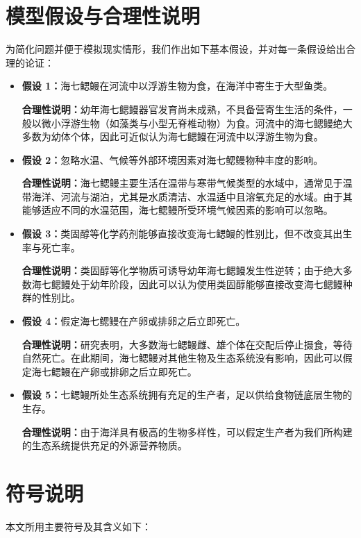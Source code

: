 \documentclass[11pt,a4paper]{ctexart}
\begin{document}
\section{模型假设与合理性说明}

为简化问题并便于模拟现实情形，我们作出如下基本假设，并对每一条假设给出合理的论证：

\begin{itemize}
\item \textbf{假设 1：}海七鳃鳗在河流中以浮游生物为食，在海洋中寄生于大型鱼类。

\textbf{合理性说明：}幼年海七鳃鳗器官发育尚未成熟，不具备营寄生生活的条件，一般以微小浮游生物（如藻类与小型无脊椎动物）为食\cite{3}。河流中的海七鳃鳗绝大多数为幼体个体，因此可近似认为海七鳃鳗在河流中以浮游生物为食。

\item \textbf{假设 2：}忽略水温、气候等外部环境因素对海七鳃鳗物种丰度的影响。

\textbf{合理性说明：}海七鳃鳗主要生活在温带与寒带气候类型的水域中，通常见于温带海洋、河流与湖泊，尤其是水质清洁、水温适中且溶氧充足的水域。由于其能够适应不同的水温范围，海七鳃鳗所受环境气候因素的影响可以忽略\cite{4}。

\item \textbf{假设 3：}类固醇等化学药剂能够直接改变海七鳃鳗的性别比，但不改变其出生率与死亡率。

\textbf{合理性说明：}类固醇等化学物质可诱导幼年海七鳃鳗发生性逆转；由于绝大多数海七鳃鳗处于幼年阶段，因此可以认为使用类固醇能够直接改变海七鳃鳗种群的性别比。

\item \textbf{假设 4：}假定海七鳃鳗在产卵或排卵之后立即死亡。

\textbf{合理性说明：}研究表明，大多数海七鳃鳗雌、雄个体在交配后停止摄食，等待自然死亡\cite{5}。在此期间，海七鳃鳗对其他生物及生态系统没有影响，因此可以假定海七鳃鳗在产卵或排卵之后立即死亡。

\item \textbf{假设 5：}七鳃鳗所处生态系统拥有充足的生产者，足以供给食物链底层生物的生存。

\textbf{合理性说明：}由于海洋具有极高的生物多样性，可以假定生产者为我们所构建的生态系统提供充足的外源营养物质。
\end{itemize}

\section{符号说明}

本文所用主要符号及其含义如下：
\end{document}
